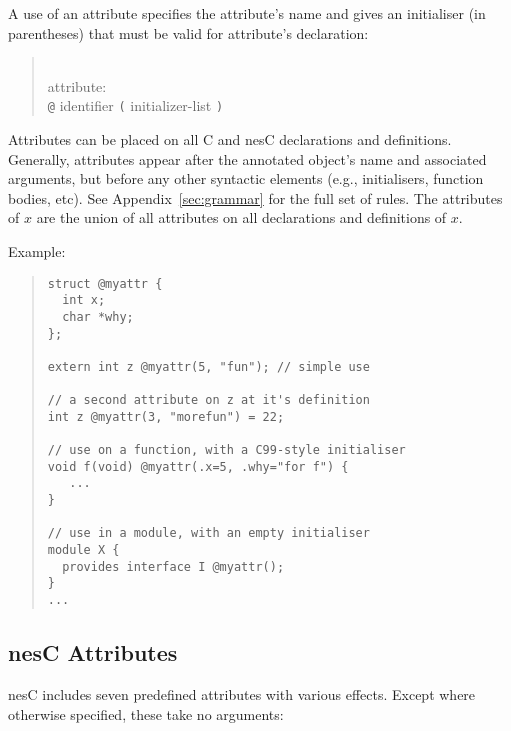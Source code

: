 \documentclass[11pt,letterpaper]{article}
\newcommand{\kw}[1]{{\tt #1}}
\newcommand{\nesc}{nesC\xspace}
\newcommand{\grammarshift}{\vspace*{-.7cm}}
\newcommand{\grammarindent}{\hspace*{2cm}\= \\ \kill}
\begin{document}
A use of an attribute specifies the attribute's name and gives an initialiser
(in parentheses) that must be valid for attribute's declaration:
\begin{quote} \grammarshift
\em \begin{tabbing}
\grammarindent
attribute:\\
\>	\kw{@} identifier \kw{(} initializer-list \kw{)}\\
\end{tabbing}
\end{quote}


Attributes can be placed on all C and \nesc declarations and definitions.
Generally, attributes appear after the annotated object's name and
associated arguments, but before any other syntactic elements (e.g.,
initialisers, function bodies, etc). See Appendix~\ref{sec:grammar} for the
full set of rules. The attributes of $x$ are the union of all attributes on
all declarations and definitions of $x$.

Example:
\begin{quote}
\begin{verbatim}
struct @myattr {
  int x;
  char *why;
};

extern int z @myattr(5, "fun"); // simple use

// a second attribute on z at it's definition
int z @myattr(3, "morefun") = 22;

// use on a function, with a C99-style initialiser
void f(void) @myattr(.x=5, .why="for f") {
   ...
}

// use in a module, with an empty initialiser
module X {
  provides interface I @myattr();
}
...
\end{verbatim}
\end{quote}

\subsection{\nesc Attributes}

\nesc includes seven predefined attributes with various effects. Except
where otherwise specified, these take no arguments:
\end{document}
